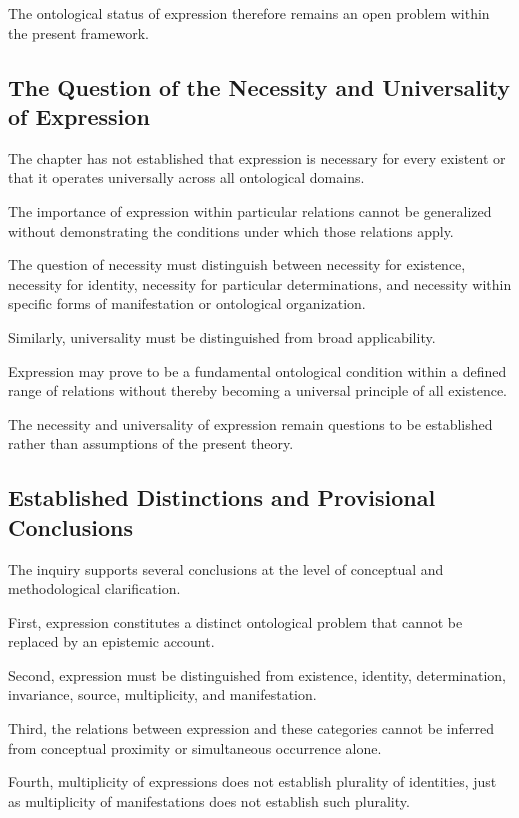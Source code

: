 The ontological status of expression therefore remains
an open problem within the present framework.

\subsection{The Question of the Necessity and Universality of Expression}

The chapter has not established that expression
is necessary for every existent or that it operates
universally across all ontological domains.

The importance of expression within particular relations
cannot be generalized without demonstrating the conditions
under which those relations apply.

The question of necessity must distinguish between
necessity for existence, necessity for identity,
necessity for particular determinations, and necessity
within specific forms of manifestation or ontological
organization.

Similarly, universality must be distinguished from
broad applicability.

Expression may prove to be a fundamental ontological
condition within a defined range of relations without
thereby becoming a universal principle of all existence.

The necessity and universality of expression remain
questions to be established rather than assumptions
of the present theory.

\subsection{Established Distinctions and Provisional Conclusions}

The inquiry supports several conclusions at the level
of conceptual and methodological clarification.

First, expression constitutes a distinct ontological
problem that cannot be replaced by an epistemic account.

Second, expression must be distinguished from existence,
identity, determination, invariance, source, multiplicity,
and manifestation.

Third, the relations between expression and these
categories cannot be inferred from conceptual proximity
or simultaneous occurrence alone.

Fourth, multiplicity of expressions does not establish
plurality of identities, just as multiplicity of
manifestations does not establish such plurality.

